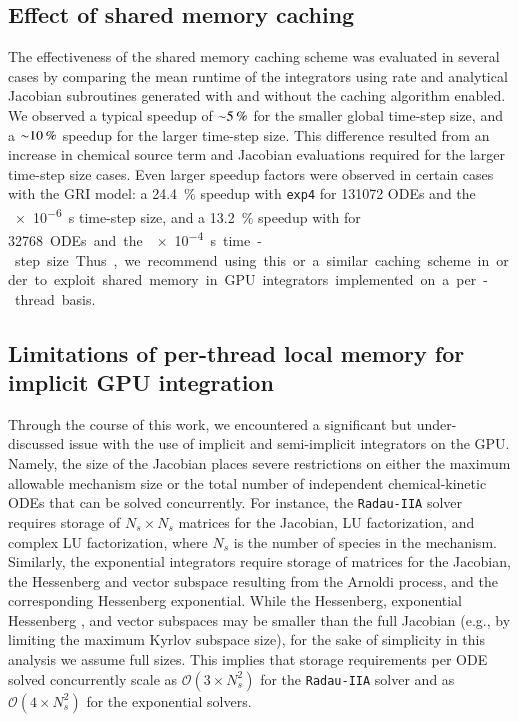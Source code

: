 \documentclass[preprint]{elsarticle}
\begin{document}
\subsection{Effect of shared memory caching}
\label{S:smem}

The effectiveness of the shared memory caching scheme was evaluated in several cases by comparing the mean runtime of the integrators using rate and analytical Jacobian subroutines generated with and without the caching algorithm enabled.
We observed a typical speedup of $\SI{\sim5}{\percent}$ for the smaller global time-step size, and a $\SI{\sim10}{\percent}$ speedup for the larger time-step size.
This difference resulted from an increase in chemical source term and Jacobian evaluations required for the larger time-step size cases.
Even larger speedup factors were observed in certain cases with the GRI model: a \SI{24.4}{\percent} speedup with \texttt{exp4} for \num{131072} ODEs and the \SI{e-6}{\second} time-step size, and a \SI{13.2}{\percent} speedup with  for \SI{32768} ODEs and the \SI{e-4}{\second} time-step size.
Thus, we recommend using this or a similar caching scheme in order to exploit shared memory in GPU integrators implemented on a per-thread basis.

\subsection{Limitations of per-thread local memory for implicit GPU integration}

Through the course of this work, we encountered a significant but under-discussed issue with the use of implicit and semi-implicit integrators on the GPU.
Namely, the size of the Jacobian places severe restrictions on either the maximum allowable mechanism size or the total number of independent chemical-kinetic ODEs that can be solved concurrently.
For instance, the \texttt{Radau-IIA} solver requires storage of $N_s \times N_s$ matrices for the Jacobian, LU factorization, and complex LU factorization, where $N_s$ is the number of species in the mechanism.
Similarly, the exponential integrators require storage of matrices for the Jacobian, the Hessenberg and vector subspace resulting from the Arnoldi process, and the corresponding Hessenberg exponential.
While the Hessenberg, exponential Hessenberg , and vector subspaces may be smaller than the full Jacobian (e.g., by limiting the maximum Kyrlov subspace size), for the sake of simplicity in this analysis we assume full sizes.
This implies that storage requirements per ODE solved concurrently scale as $\mathcal{O}\left(3 \times N_s^2\right)$ for the \texttt{Radau-IIA} solver and as $\mathcal{O}\left(4 \times N_s^2\right)$ for the exponential solvers.
\end{document}
